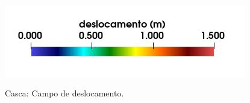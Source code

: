 \documentclass[tese_patricia]{subfiles}
\begin{document}
\begin{figure}[!htb]
	\\
	{\includegraphics[scale=0.3,trim=0cm 0cm 0cm 0cm, clip=true]{Imagens/Cap3/legenda.png}}
	\caption{Casca: Campo de deslocamento.}
	\label{fig:CamposDeslocamentos}
\end{figure}




\end{document}
